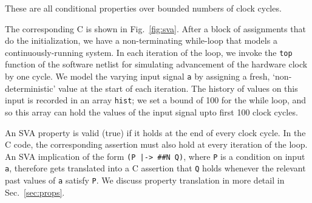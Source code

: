 \noindent These are all conditional properties over bounded numbers of clock cycles. 
 
The corresponding C is shown in Fig.~\ref{fig:sva}. After a block of assignments that do the initialization, we have a non-terminating while-loop that models a continuously-running system. In each iteration of the loop, we invoke the \texttt{top} function of the software netlist for simulating advancement of the hardware clock by one cycle.   We model the varying input signal \texttt{a} by assigning a fresh, `non-deterministic' value at the start of each iteration. The history of values on this input is recorded in an array \texttt{hist}; we set a bound of 100 for the while loop, and so this array can hold the values of the input signal upto first 100 clock cycles. 

An SVA property is valid (true) if it holds at the end of every clock cycle. In the C code, the corresponding assertion must also hold at every iteration of the loop. An SVA implication of the form \texttt{(P |-> \#\#N Q)}, where \texttt{P} is a condition on input \texttt{a}, therefore gets translated into a C assertion that \texttt{Q} holds whenever the relevant past values of \texttt{a} satisfy \texttt{P}. We discuss property translation in more detail in Sec.~\ref{sec:props}.

